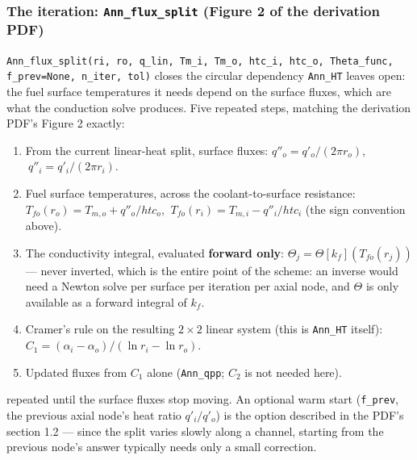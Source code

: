 \documentclass[11pt]{article}
\newcommand{\code}[1]{\texttt{#1}}
\begin{document}
\subsubsection*{The iteration: \code{Ann\_flux\_split} (Figure 2 of the derivation PDF)}

\code{Ann\_flux\_split(ri, ro, q\_lin, Tm\_i, Tm\_o, htc\_i, htc\_o, Theta\_func,
f\_prev=None, n\_iter, tol)} closes the circular dependency \code{Ann\_HT} leaves open:
the fuel surface temperatures it needs depend on the surface fluxes, which are what the
conduction solve produces. Five repeated steps, matching the derivation PDF's Figure 2
exactly:

\begin{enumerate}
  \item From the current linear-heat split, surface fluxes:
    $q''_o = q'_o/(2\pi r_o)$, $\ q''_i = q'_i/(2\pi r_i)$.
  \item Fuel surface temperatures, across the coolant-to-surface resistance:
    $T_{fo}(r_o)=T_{m,o}+q''_o/htc_o$, $\ T_{fo}(r_i)=T_{m,i}-q''_i/htc_i$ (the sign
    convention above).
  \item The conductivity integral, evaluated \textbf{forward only}:
    $\Theta_j=\Theta[k_f](T_{fo}(r_j))$ --- never inverted, which is the entire point of
    the scheme: an inverse would need a Newton solve per surface per iteration per
    axial node, and $\Theta$ is only available as a forward integral of $k_f$.
  \item Cramer's rule on the resulting $2\times2$ linear system (this is \code{Ann\_HT}
    itself): $C_1 = (\alpha_i-\alpha_o)/(\ln r_i - \ln r_o)$.
  \item Updated fluxes from $C_1$ alone (\code{Ann\_qpp}; $C_2$ is not needed here).
\end{enumerate}

repeated until the surface fluxes stop moving. An optional warm start
(\code{f\_prev}, the previous axial node's heat ratio $q'_i/q'_o$) is the option
described in the PDF's section 1.2 --- since the split varies slowly along a channel,
starting from the previous node's answer typically needs only a small correction.
\end{document}
